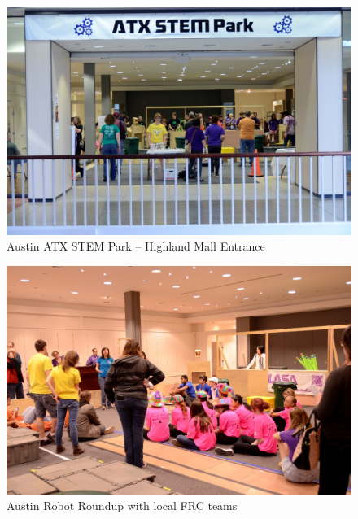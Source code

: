\begin{figure}[H]
	\centering
	\includegraphics[height=0.9\linewidth]{stempark}
	\caption[]{Austin ATX STEM Park – Highland Mall Entrance}
	\label{fig:stempark}
\end{figure}
\begin{figure}[H]
	\centering
	\includegraphics[height=0.7\linewidth]{arr}
	\caption[]{Austin Robot Roundup with local FRC teams}
	\label{fig:arr}
\end{figure}
